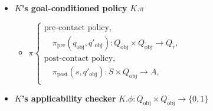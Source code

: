 



\begin{definition} \label{Def:Skill}
\noindent\hrulefill
\normalfont

\begin{itemize}\label{Def:NP}
    \item \textbf{$K$'s goal-conditioned policy} \(K.\pi\)

    \begin{itemize}
        \item \(\pi  
            \begin{cases} 
            \text{pre-contact policy,} \\ 
            \quad \pi_\text{pre}(q_\text{obj}, q'_\text{obj}): Q_\text{obj} \times Q_\text{obj} \rightarrow Q_r, \\[5pt]
            
            \text{post-contact policy,} \\ 
            \quad \pi_\text{post}(s, q'_\text{obj}): S \times Q_\text{obj} \rightarrow A, \\[5pt]
    
            \end{cases}\)
    \end{itemize}

    
    \item \textbf{$K$'s applicability checker} $K.\phi: Q_\text{obj} \times Q_\text{obj} \rightarrow \{0, 1\}$
\end{itemize}
\end{definition}

